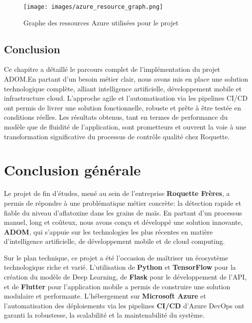 \documentclass[12pt,a4paper]{report}
\begin{document}
\begin{figure}[H]
    \centering
    \texttt{[image: images/azure\_resource\_graph.png]}
    \caption{Graphe des ressources Azure utilisées pour le projet}
\end{figure}

\section{Conclusion}
Ce chapitre a détaillé le parcours complet de l’implémentation du projet ADOM.\@ En partant d’un besoin métier clair, nous avons mis en place une solution technologique complète, alliant intelligence artificielle, développement mobile et infrastructure cloud. L’approche agile et l’automatisation via les pipelines CI/CD ont permis de livrer une solution fonctionnelle, robuste et prête à être testée en conditions réelles. Les résultats obtenus, tant en termes de performance du modèle que de fluidité de l’application, sont prometteurs et ouvrent la voie à une transformation significative du processus de contrôle qualité chez Roquette.

\cleardoublepage
\chapter*{Conclusion générale}

Le projet de fin d’études, mené au sein de l’entreprise \textbf{Roquette Frères}, a permis de répondre à une problématique métier concrète: la détection rapide et fiable du niveau d’aflatoxine dans les grains de maïs. En partant d’un processus manuel, long et coûteux, nous avons conçu et développé une solution innovante, \textbf{ADOM}, qui s’appuie sur les technologies les plus récentes en matière d’intelligence artificielle, de développement mobile et de cloud computing.

\medskip
\noindent
Sur le plan technique, ce projet a été l’occasion de maîtriser un écosystème technologique riche et varié. L’utilisation de \textbf{Python} et \textbf{TensorFlow} pour la création du modèle de Deep Learning, de \textbf{Flask} pour le développement de l’API, et de \textbf{Flutter} pour l’application mobile a permis de construire une solution modulaire et performante. L’hébergement sur \textbf{Microsoft Azure} et l’automatisation des déploiements via les pipelines \textbf{CI/CD} d’Azure DevOps ont garanti la robustesse, la scalabilité et la maintenabilité du système.
\end{document}
